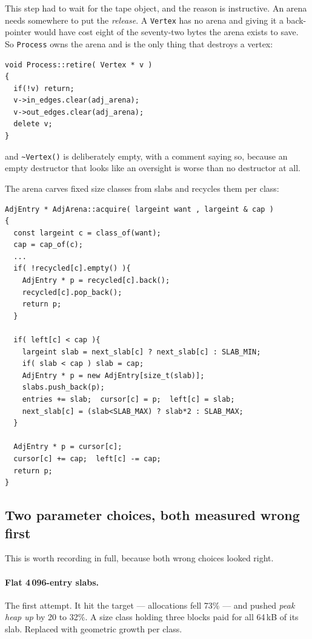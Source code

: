 \documentclass[11pt,a4paper]{report}
\newcommand{\code}[1]{\texttt{#1}}
\begin{document}
This step had to wait for the tape object, and the reason is instructive. An
arena needs somewhere to put the \emph{release}. A \code{Vertex} has no arena and
giving it a back-pointer would have cost eight of the seventy-two bytes the
arena exists to save. So \code{Process} owns the arena and is the only thing
that destroys a vertex:

\begin{lstlisting}
void Process::retire( Vertex * v )
{
  if(!v) return;
  v->in_edges.clear(adj_arena);
  v->out_edges.clear(adj_arena);
  delete v;
}
\end{lstlisting}

\noindent
and \code{\textasciitilde Vertex()} is deliberately empty, with a comment saying
so, because an empty destructor that looks like an oversight is worse than no
destructor at all.

The arena carves fixed size classes from slabs and recycles them per class:

\begin{lstlisting}
AdjEntry * AdjArena::acquire( largeint want , largeint & cap )
{
  const largeint c = class_of(want);
  cap = cap_of(c);
  ...
  if( !recycled[c].empty() ){
    AdjEntry * p = recycled[c].back();
    recycled[c].pop_back();
    return p;
  }

  if( left[c] < cap ){
    largeint slab = next_slab[c] ? next_slab[c] : SLAB_MIN;
    if( slab < cap ) slab = cap;
    AdjEntry * p = new AdjEntry[size_t(slab)];
    slabs.push_back(p);
    entries += slab;  cursor[c] = p;  left[c] = slab;
    next_slab[c] = (slab<SLAB_MAX) ? slab*2 : SLAB_MAX;
  }

  AdjEntry * p = cursor[c];
  cursor[c] += cap;  left[c] -= cap;
  return p;
}
\end{lstlisting}

\subsection*{Two parameter choices, both measured wrong first}

This is worth recording in full, because both wrong choices looked right.

\paragraph{Flat 4\,096-entry slabs.} The first attempt. It hit the target ---
allocations fell 73\% --- and pushed \emph{peak heap up} by 20 to 32\%. A size
class holding three blocks paid for all 64\,kB of its slab. Replaced with
geometric growth per class.
\end{document}

